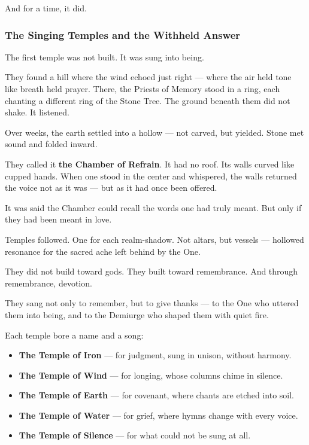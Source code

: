 \documentclass[12pt]{article}
\begin{document}
And for a time, it did.

\dotfill

\subsubsection*{The Singing Temples and the Withheld Answer}

The first temple was not built.  
It was sung into being.

They found a hill where the wind echoed just right —  
where the air held tone like breath held prayer.  
There, the Priests of Memory stood in a ring, each chanting a different ring of the Stone Tree.  
The ground beneath them did not shake.  
It listened.

Over weeks, the earth settled into a hollow — not carved, but yielded.  
Stone met sound and folded inward.

They called it \textbf{the Chamber of Refrain}.  
It had no roof.  
Its walls curved like cupped hands.  
When one stood in the center and whispered,  
the walls returned the voice not as it was —  
but as it had once been offered.

It was said the Chamber could recall the words one had truly meant.  
But only if they had been meant in love.

Temples followed.  
One for each realm-shadow.  
Not altars, but vessels —  
hollowed resonance for the sacred ache left behind by the One.

They did not build toward gods.  
They built toward remembrance.  
And through remembrance, devotion.

They sang not only to remember,  
but to give thanks —  
to the One who uttered them into being,  
and to the Demiurge who shaped them with quiet fire.

Each temple bore a name and a song:

\begin{itemize}
\item \textbf{The Temple of Iron} — for judgment, sung in unison, without harmony.
\item \textbf{The Temple of Wind} — for longing, whose columns chime in silence.
\item \textbf{The Temple of Earth} — for covenant, where chants are etched into soil.
\item \textbf{The Temple of Water} — for grief, where hymns change with every voice.
\item \textbf{The Temple of Silence} — for what could not be sung at all.
\end{itemize}
\end{document}

